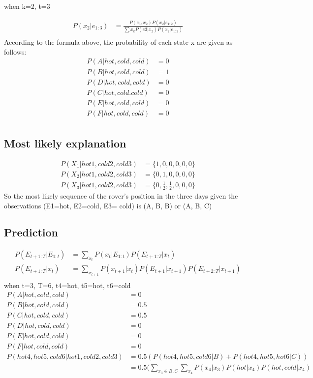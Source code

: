 \documentclass[12pt]{amsart}
\begin{document}
when k=2, t=3

\begin{equation} \label{eq3}
\begin{split}
P(x_2|e_{1:3})  & = \frac{P(e_3 , x_2) P(x_2| e_{1:2})}{\sum{x_k}{P(e3|x_2) P(x_2| e_{1:2})}} \\
\end{split}
\end{equation}
According to the formula above, the probability of each state x are given as follows:
\begin{align*}
P(A|hot, cold, cold) &= 0\\
P(B|hot, cold, cold) &= 1\\
P(D|hot, cold, cold) &= 0\\
P(C|hot, cold. cold) &= 0\\
P(E|hot, cold, cold) &= 0\\
P(F|hot, cold, cold) &= 0\\
\end{align*}

\subsection*{Most likely explanation}
\begin{align*}
P(X_1 | hot1, cold2, cold3) &= \{1, 0, 0, 0, 0, 0\} \\
P(X_2 | hot1, cold2, cold3) &= \{0, 1, 0, 0, 0, 0\} \\
P(X_3 | hot1, cold2, cold3) &= \{0, \frac{1}{2}, \frac{1}{2}, 0, 0, 0\}
\end{align*}
So the most likely sequence of the rover's position in the three days given the observations (E1=hot, E2=cold, E3= cold) is  (A, B, B) or (A, B, C)

\subsection*{Prediction}
\begin{align*}
P(E_{t+1:T} | E_{1:t}) &= \sum_{x_t} P(x_t| E_{1:t})P(E_{t+1:T}|x_t) \\
P(E_{t+1:T} | x_t) &= \sum_{x_{t+1}}{P(x_{t+1}| x_t)P(E_{t+1}|x_{t+1})P(E_{t+2:T}|x_{t+1})} \\
\end{align*}
when t=3, T=6, t4=hot, t5=hot, t6=cold 
\begin{align*}
P(A|hot, cold, cold) &= 0  \\
P(B|hot, cold, cold) &=0.5 \\
P(C|hot, cold, cold) &=0.5 \\
P(D|hot, cold, cold) &=0  \\
P(E|hot, cold, cold) &=0  \\
P(F|hot, cold, cold)  &= 0 \\
P(hot4, hot5, cold6 | hot1, cold2, cold3) &= 0.5 (P(hot4, hot5, cold6 | B) + P(hot4, hot5, hot6 | C)) \\
							     &= 0.5 (\sum_{x_3 \in B, C}\sum_{x_4} P(x_4| x_3)P(hot|x_4)P(hot, cold|x_{4})
\end{align*}
\end{document}
